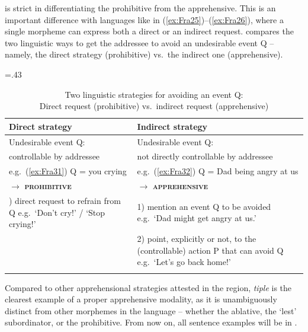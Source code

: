 \documentclass[output=paper,colorlinks,citecolor=brown]{langscibook}
\begin{document}
 is strict in differentiating the prohibitive from the apprehensive. This is an important difference with languages like  in (\ref{ex:Fra25})--(\ref{ex:Fra26}), where a single morpheme can express both a direct or an indirect request.  compares the two linguistic ways to get the addressee to avoid an undesirable event Q -- namely, the direct strategy (prohibitive) vs.\ the indirect one (apprehensive).


\begin{table}
\caption{Two linguistic strategies for avoiding an event Q:\\Direct request (prohibitive) vs.\ indirect request (apprehensive)}
\label{tab:avoidingstrategies}
\tabcolsep=.43\tabcolsep%
\begin{tabularx}{\textwidth}{QQ}
\lsptoprule
{\textbf{Direct strategy}} & {\textbf{Indirect strategy}} \\
\midrule
Undesirable event Q: & Undesirable event Q: \\
controllable by addressee & not directly controllable by addressee \\
e.g.\ (\ref{ex:Fra31}) Q = you crying & e.g.\ (\ref{ex:Fra32}) Q = Dad being angry at us \\
\tablevspace
$\rightarrow$ \textbf{\textsc{prohibitive}} & $\rightarrow$ \textbf{\textsc{apprehensive}} \\
) direct request to refrain from Q\newline
e.g.\ `Don’t cry!' / `Stop crying!' & 1) mention an event Q to be avoided \newline
                                        e.g.\ `Dad might get angry at us.' \\
 & 2) point, explicitly or not, to the (controllable) action P that can avoid Q \newline
    e.g.\ `Let's go back home!' \\
 \lspbottomrule
\end{tabularx}
\end{table}




 
Compared to other apprehensional strategies attested in the region,  \textit{tiple} is the clearest example of a proper apprehensive modality, as it is unambiguously distinct from other morphemes in the language -- whether the ablative, the `lest' subordinator, or the prohibitive. From now on, all sentence examples will be in .
\end{document}
